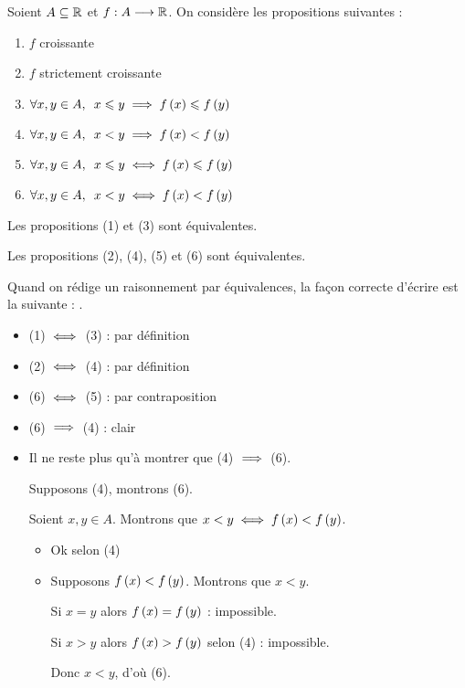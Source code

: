 \begin{rem}
Soient \(A\subseteq\mathbb{R}\) et \(f:A\longrightarrow\mathbb{R}\). On considère les propositions suivantes :

\begin{enumerate}
\item \(f\) croissante

\item \(f\) strictement croissante

\item \(\quantifs{\forall x,y\in A}x\leq y\imp f\paren{x}\leq f\paren{y}\)

\item \(\quantifs{\forall x,y\in A}x<y\imp f\paren{x}<f\paren{y}\)

\item \(\quantifs{\forall x,y\in A}x\leq y\ssi f\paren{x}\leq f\paren{y}\)

\item \(\quantifs{\forall x,y\in A}x<y\ssi f\paren{x}<f\paren{y}\)
\end{enumerate}

Les propositions (1) et (3) sont équivalentes.

Les propositions (2), (4), (5) et (6) sont équivalentes.
\end{rem}

\begin{rem}
Quand on rédige un raisonnement par équivalences, la façon correcte d'écrire est la suivante : .
\end{rem}

\begin{dem}
\begin{itemize}
\item (1) \(\iff\) (3) : par définition

\item (2) \(\iff\) (4) : par définition

\item (6) \(\iff\) (5) : par contraposition

\item (6) \(\implies\) (4) : clair

\item Il ne reste plus qu'à montrer que (4) \(\implies\) (6).

Supposons (4), montrons (6).

Soient \(x,y\in A\). Montrons que \(x<y\iff f\left(x\right)<f\left(y\right)\).

\begin{itemize}
\item[\impdir] Ok selon (4)

\item[\imprec] Supposons \(f\left(x\right)<f\left(y\right)\). Montrons que \(x<y\).

Si \(x=y\) alors \(f\left(x\right)=f\left(y\right)\) : impossible.

Si \(x>y\) alors \(f\left(x\right)>f\left(y\right)\) selon (4) : impossible.

Donc \(x<y\), d'où (6).
\end{itemize}
\end{itemize}
\end{dem}

